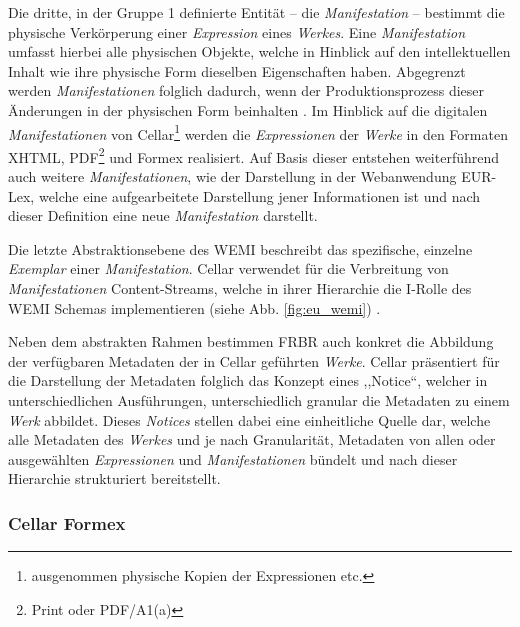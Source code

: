 \medskip
Die dritte, in der Gruppe 1 definierte Entität -- die \textit{Manifestation} -- bestimmt die physische Verkörperung einer \textit{Expression} eines \textit{Werkes}.
Eine \textit{Manifestation} umfasst hierbei alle physischen Objekte, welche in Hinblick auf den intellektuellen Inhalt wie ihre physische Form dieselben Eigenschaften haben.
Abgegrenzt werden \textit{Manifestationen} folglich dadurch, wenn der Produktionsprozess dieser Änderungen in der physischen Form beinhalten \cite[S. 20f]{eu_frbr}.
Im Hinblick auf die digitalen \textit{Manifestationen} von Cellar\footnote{ausgenommen physische Kopien der Expressionen etc.} werden die \textit{Expressionen} der \textit{Werke} in den Formaten XHTML, PDF\footnote{Print oder PDF/A1(a)} und Formex realisiert. 
Auf Basis dieser entstehen weiterführend auch weitere \textit{Manifestationen}, wie der Darstellung in der Webanwendung EUR-Lex, welche eine aufgearbeitete Darstellung jener Informationen ist und nach dieser Definition eine neue \textit{Manifestation} darstellt.


\medskip
Die letzte Abstraktionsebene des \acs{WEMI} beschreibt das spezifische, einzelne \textit{Exemplar} einer \textit{Manifestation}. \cite[22]{eu_frbr}
Cellar verwendet für die Verbreitung von \textit{Manifestationen} Content-Streams, welche in ihrer Hierarchie die I-Rolle des \ac{WEMI} Schemas implementieren (siehe Abb. \ref{fig:eu_wemi}) \cite[29]{eu_cellar}. 

\medskip
Neben dem abstrakten Rahmen bestimmen \acs{FRBR} auch konkret die Abbildung der verfügbaren Metadaten der in Cellar geführten \textit{Werke}.
Cellar präsentiert für die Darstellung der Metadaten folglich das Konzept eines ,,Notice``, welcher in unterschiedlichen Ausführungen, unterschiedlich granular die Metadaten zu einem \textit{Werk} abbildet.
Dieses \textit{Notices} stellen dabei eine einheitliche Quelle dar, welche alle Metadaten des \textit{Werkes} und je nach Granularität, Metadaten von allen oder ausgewählten \textit{Expressionen} und \textit{Manifestationen} bündelt und nach dieser Hierarchie strukturiert bereitstellt.
\cite[S. 31f]{eu_cellar}

\pagebreak
    \subsubsection{Cellar Formex}


